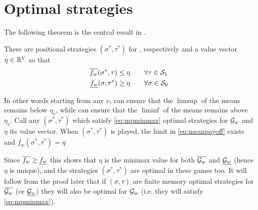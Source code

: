 \section{Optimal strategies}

The following theorem is the central result in \cite{ehrenfeucht_positional_1979}.

\begin{theorem}
    \label{thm:posMeanPayoff}
    There are positional strategies $(\sigma^*,\tau^*)$ for ,  respectively and a value vector $\eta \in \mathbb{R}^V$ so that
    \begin{equation}
        \label{eq:mpminmax}
        \begin{aligned}
            \overline{f_w}(\sigma^*,\tau) &\leq \eta \qquad \forall \tau \in \mathcal{S}_1\\
            \underline{f_w}(\sigma,\tau^*) &\geq \eta \qquad \forall \sigma \in \mathcal{S}_0
        \end{aligned}
    \end{equation}
\end{theorem}

In other words starting from any $v$,  can ensure that the $\limsup$ of the means remains below $\eta_v$, while  can ensure that the $\liminf$ of the means remains above $\eta_v$. Call any $(\sigma^*,\tau^*)$ which satisfy \eqref{eq:mpminmax} optimal strategies for $\mathcal{G}_w$ and $\eta$ its value vector. When $(\sigma^*,\tau^*)$ is played, the limit in \eqref{eq:meanpayoff} exists and $f_w(\sigma^*,\tau^*)=\eta$

Since $\overline{f_w} \geq \underline{f_w}$ this shows that $\eta$ is the minimax value for both $\overline{\mathcal{G}_w}$ and $\underline{\mathcal{G}_w}$ (hence $\eta$ is unique), and the strategies $(\sigma^*,\tau^*)$ are optimal in these games too. It will follow from the proof later that if $(\sigma,\tau)$ are finite memory optimal strategies for $\overline{\mathcal{G}_w}$ (or $\underline{\mathcal{G}_w}$) they will also be optimal for $\mathcal{G}_w$ (i.e. they will satisfy \eqref{eq:mpminmax}).\\

